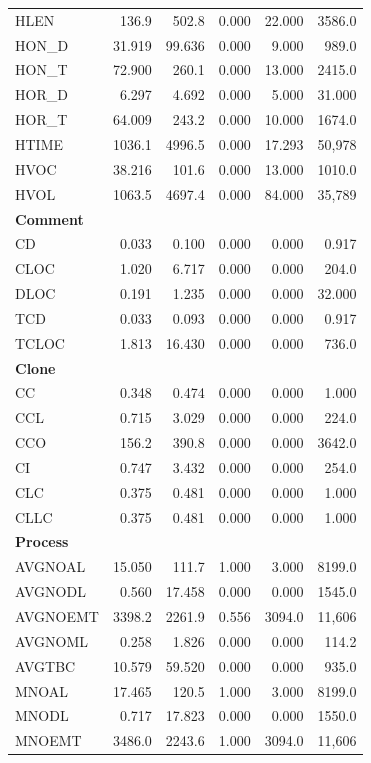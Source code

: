 \begin{longtable}{@{}lrrrrr@{}}
HLEN & 136.9 & 502.8 & 0.000 & 22.000 & 3586.0 \\
HON\_D & 31.919 & 99.636 & 0.000 & 9.000 & 989.0 \\
HON\_T & 72.900 & 260.1 & 0.000 & 13.000 & 2415.0 \\
HOR\_D & 6.297 & 4.692 & 0.000 & 5.000 & 31.000 \\
HOR\_T & 64.009 & 243.2 & 0.000 & 10.000 & 1674.0 \\
HTIME & 1036.1 & 4996.5 & 0.000 & 17.293 & 50,978 \\
HVOC & 38.216 & 101.6 & 0.000 & 13.000 & 1010.0 \\
HVOL & 1063.5 & 4697.4 & 0.000 & 84.000 & 35,789 \\
\addlinespace
\textbf{Comment} & & & & & \\
CD & 0.033 & 0.100 & 0.000 & 0.000 & 0.917 \\
CLOC & 1.020 & 6.717 & 0.000 & 0.000 & 204.0 \\
DLOC & 0.191 & 1.235 & 0.000 & 0.000 & 32.000 \\
TCD & 0.033 & 0.093 & 0.000 & 0.000 & 0.917 \\
TCLOC & 1.813 & 16.430 & 0.000 & 0.000 & 736.0 \\
\addlinespace
\textbf{Clone} & & & & & \\
CC & 0.348 & 0.474 & 0.000 & 0.000 & 1.000 \\
CCL & 0.715 & 3.029 & 0.000 & 0.000 & 224.0 \\
CCO & 156.2 & 390.8 & 0.000 & 0.000 & 3642.0 \\
CI & 0.747 & 3.432 & 0.000 & 0.000 & 254.0 \\
CLC & 0.375 & 0.481 & 0.000 & 0.000 & 1.000 \\
CLLC & 0.375 & 0.481 & 0.000 & 0.000 & 1.000 \\
\addlinespace
\textbf{Process} & & & & & \\
AVGNOAL & 15.050 & 111.7 & 1.000 & 3.000 & 8199.0 \\
AVGNODL & 0.560 & 17.458 & 0.000 & 0.000 & 1545.0 \\
AVGNOEMT & 3398.2 & 2261.9 & 0.556 & 3094.0 & 11,606 \\
AVGNOML & 0.258 & 1.826 & 0.000 & 0.000 & 114.2 \\
AVGTBC & 10.579 & 59.520 & 0.000 & 0.000 & 935.0 \\
MNOAL & 17.465 & 120.5 & 1.000 & 3.000 & 8199.0 \\
MNODL & 0.717 & 17.823 & 0.000 & 0.000 & 1550.0 \\
MNOEMT & 3486.0 & 2243.6 & 1.000 & 3094.0 & 11,606 \\

\end{longtable}
